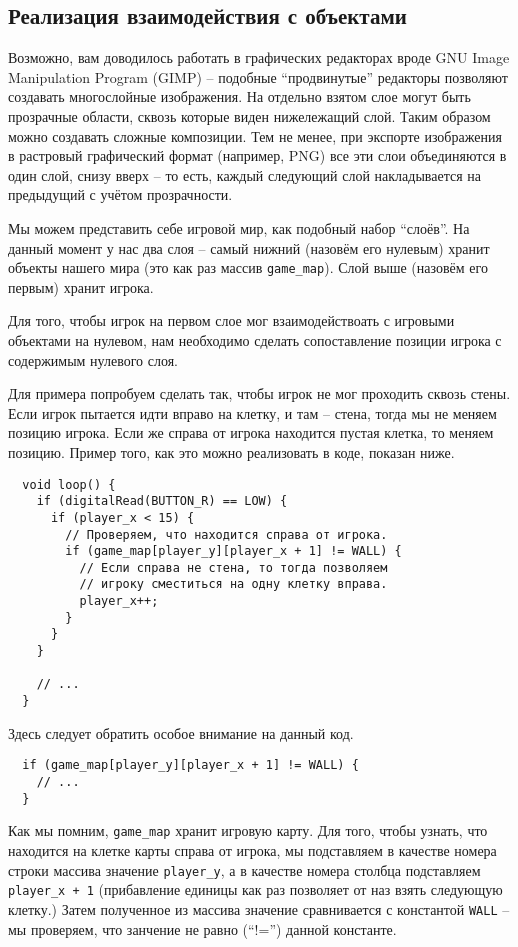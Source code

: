 \documentclass[../sparc.tex]{subfiles}
\begin{document}
\subsection{Реализация взаимодействия с объектами}

Возможно, вам доводилось работать в графических редакторах вроде GNU Image
Manipulation Program (GIMP) -- подобные ``продвинутые'' редакторы позволяют
создавать многослойные изображения.  На отдельно взятом слое могут быть
прозрачные области, сквозь которые виден нижележащий слой.  Таким образом можно
создавать сложные композиции.  Тем не менее, при экспорте изображения в
растровый графический формат (например, PNG) все эти слои объединяются в один
слой, снизу вверх -- то есть, каждый следующий слой накладывается на предыдущий
с учётом прозрачности.

Мы можем представить себе игровой мир, как подобный набор ``слоёв''.  На данный
момент у нас два слоя -- самый нижний (назовём его нулевым) хранит объекты
нашего мира (это как раз массив \texttt{game\_map}).  Слой выше (назовём его
первым) хранит игрока.

Для того, чтобы игрок на первом слое мог взаимодействоать с игровыми объектами
на нулевом, нам необходимо сделать сопоставление позиции игрока с содержимым
нулевого слоя.

Для примера попробуем сделать так, чтобы игрок не мог проходить сквозь стены.
Если игрок пытается идти вправо на клетку, и там -- стена, тогда мы не меняем
позицию игрока. Если же справа от игрока находится пустая клетка, то меняем
позицию.  Пример того, как это можно реализовать в коде, показан ниже.

\begin{verbatim}
  void loop() {
    if (digitalRead(BUTTON_R) == LOW) {
      if (player_x < 15) {
        // Проверяем, что находится справа от игрока.
        if (game_map[player_y][player_x + 1] != WALL) {
          // Если справа не стена, то тогда позволяем
          // игроку сместиться на одну клетку вправа.
          player_x++;
        }
      }
    }

    // ...
  }
\end{verbatim}

Здесь следует обратить особое внимание на данный код.

\begin{verbatim}
  if (game_map[player_y][player_x + 1] != WALL) {
    // ...
  }
\end{verbatim}

Как мы помним, \texttt{game\_map} хранит игровую карту.  Для того, чтобы узнать,
что находится на клетке карты справа от игрока, мы подставляем в качестве номера
строки массива значение \texttt{player\_y}, а в качестве номера столбца
подставляем \texttt{player\_x + 1} (прибавление единицы как раз позволяет от наз
взять следующую клетку.)  Затем полученное из массива значение сравнивается с
константой \texttt{WALL} -- мы проверяем, что занчение не равно (``!='') данной
константе.
\end{document}
